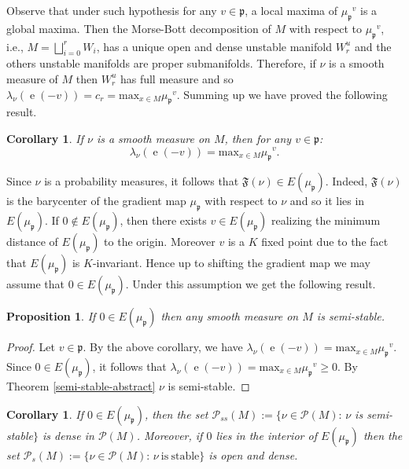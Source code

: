 \documentclass[leqno,11pt, a4]{amsart}
\newtheorem{prop}[equation]{Proposition}
\newtheorem{cor}[equation]{Corollary}
\theoremstyle{named}
\begin{document}
Observe that under such hypothesis for any $v \in {\mathfrak{p}}$, a local maxima of  ${\mu_{\mathfrak{p}}}^v$ is a global maxima. Then the Morse-Bott decomposition of $M$ with respect to ${\mu_{\mathfrak{p}}}^v$, i.e., $M = \bigsqcup_{i=0}^r W_i$,
has a unique open and dense unstable manifold $W_r^u$ and the others unstable manifolds are proper submanifolds. Therefore, if $\nu$ is a smooth measure of $M$ then $W_r^u$ has full measure and so
$
{\lambda}_\nu ({\operatorname{e}} (-v))=  c_r =\mathrm{max}_{x\in M} {\mu_{\mathfrak{p}}}^v.
$
Summing up we have proved the following result.
\begin{cor}\label{misure-liscie-lambda}
If $\nu$ is a smooth measure on $M$, then for any $v\in {\mathfrak{p}}$:
\[
{\lambda}_\nu ( {\operatorname{e}}(-v) )=\mathrm{max}_{x\in M} {\mu_{\mathfrak{p}}}^v.
\]
\end{cor}
Since $\nu$ is a probability measures, it follows that ${\mathfrak{F}} (\nu) \in E({\mu_{\mathfrak{p}}})$. Indeed, ${\mathfrak{F}} (\nu)$ is the barycenter of the gradient map ${\mu_{\mathfrak{p}}}$ with respect to $\nu$ and so it lies in $E({\mu_{\mathfrak{p}}})$.  If $0\notin E({\mu_{\mathfrak{p}}})$, then there exists $v\in E({\mu_{\mathfrak{p}}})$ realizing the minimum distance of $E({\mu_{\mathfrak{p}}})$ to the origin. Moreover $v$ is a $K$ fixed point due to the fact that $E({\mu_{\mathfrak{p}}})$ is $K$-invariant. Hence  up to shifting the gradient map we may assume that $0\in E({\mu_{\mathfrak{p}}})$. Under this assumption we get the following result.
\begin{prop}\label{measure-semistable}
If $0\in E({\mu_{\mathfrak{p}}})$ then any smooth measure on $M$ is semi-stable.
\end{prop}
\begin{proof}
Let $v\in {\mathfrak{p}}$. By the above corollary, we have
${\lambda}_\nu ({\operatorname{e}}(-v))=\mathrm{max}_{x\in M} {\mu_{\mathfrak{p}}}^v.$ Since $0\in E({\mu_{\mathfrak{p}}})$, it follows that ${\lambda}_\nu ( {\operatorname{e}}(-v) )=\mathrm{max}_{x\in M} {\mu_{\mathfrak{p}}}^v \geq 0$. By Theorem \ref{semi-stable-abstract} $\nu$ is semi-stable.
\end{proof}
\begin{cor}\label{stable-semi-stable-dense}
  If $0\in E({\mu_{\mathfrak{p}}}) $, then the set
  ${\mathscr{P}}_{ss} (M) :=\{\nu\in {\mathscr{P}} (M):\, \nu$ is semi-stable$\}$
  is dense in ${{\mathscr{P}}(M)}$. Moreover, if $0$ lies in the interior of $E({\mu_{\mathfrak{p}}})$ then  the set
  ${\mathscr{P}}_{s} (M) :=\{\nu\in {\mathscr{P}} (M):\, \nu\ \mathrm{is\ stable} \}$ is open and dense.
\end{cor}
\end{document}
